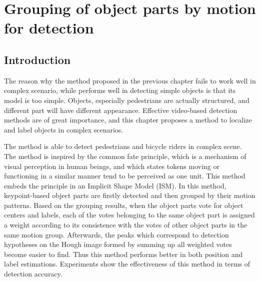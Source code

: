 \chapter{Grouping of object parts by motion for detection}
\label{chp4}
\section{Introduction}

The reason why the method proposed in the previous chapter fails to work well in complex scenario, while performs well in detecting simple objects is that its model is too simple. Objects, especially pedestrians are actually structured, and different part will have different appearance.
Effective video-based detection methods are of great importance, and this chapter proposes a method to localize and label objects in complex scenarios.

The method is able to detect pedestrians and bicycle riders in complex scene. The method is inspired by the common fate principle, which is a mechanism of visual perception in human beings, and which states  tokens moving or functioning in a similar manner tend to be  perceived
as one unit. This method embeds the principle in an Implicit Shape Model (ISM). In this method, keypoint-based
object parts are firstly detected and then grouped by their motion patterns. Based on the grouping results, when the object parts vote for object centers and labels, each of the votes belonging to the same object part is assigned a weight according to its consistence with the votes of other object parts in the same motion group. Afterwards, the peaks which correspond to detection hypotheses on the Hough image formed by summing up all weighted votes become easier to find. Thus this method  performs better in both position and label estimations. Experiments show the effectiveness of this method in terms of detection accuracy.





